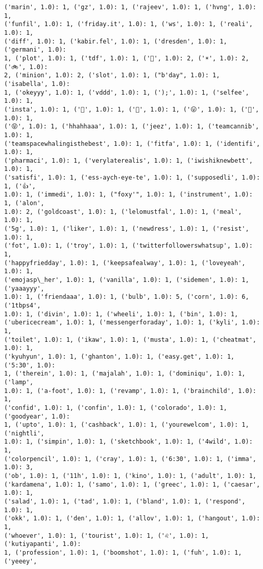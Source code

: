 \documentclass[11pt]{article}
\begin{document}
\begin{Verbatim}[commandchars=\\\{\}]
('marin', 1.0): 1, ('gz', 1.0): 1, ('rajeev', 1.0): 1, ('hvng', 1.0): 1,
('funfil', 1.0): 1, ('friday.it', 1.0): 1, ('ws', 1.0): 1, ('reali', 1.0): 1,
('diff', 1.0): 1, ('kabir.fel', 1.0): 1, ('dresden', 1.0): 1, ('germani', 1.0):
1, ('plot', 1.0): 1, ('tdf', 1.0): 1, ('🍷', 1.0): 2, ('☀', 1.0): 2, ('🚲', 1.0):
2, ('minion', 1.0): 2, ('slot', 1.0): 1, ("b'day", 1.0): 1, ('isabella', 1.0):
1, ('okeyyy', 1.0): 1, ('vddd', 1.0): 1, (');', 1.0): 1, ('selfee', 1.0): 1,
('insta', 1.0): 1, ('🙆', 1.0): 1, ('🙌', 1.0): 1, ('😛', 1.0): 1, ('🐒', 1.0): 1,
('😝', 1.0): 1, ('hhahhaaa', 1.0): 1, ('jeez', 1.0): 1, ('teamcannib', 1.0): 1,
('teamspacewhalingisthebest', 1.0): 1, ('fitfa', 1.0): 1, ('identifi', 1.0): 1,
('pharmaci', 1.0): 1, ('verylaterealis', 1.0): 1, ('iwishiknewbett', 1.0): 1,
('satisfi', 1.0): 1, ('ess-aych-eye-te', 1.0): 1, ('supposedli', 1.0): 1, ('👍',
1.0): 1, ('immedi', 1.0): 1, ("foxy'", 1.0): 1, ('instrument', 1.0): 1, ('alon',
1.0): 2, ('goldcoast', 1.0): 1, ('lelomustfal', 1.0): 1, ('meal', 1.0): 1,
('5g', 1.0): 1, ('liker', 1.0): 1, ('newdress', 1.0): 1, ('resist', 1.0): 1,
('fot', 1.0): 1, ('troy', 1.0): 1, ('twitterfollowerswhatsup', 1.0): 1,
('happyfriedday', 1.0): 1, ('keepsafealway', 1.0): 1, ('loveyeah', 1.0): 1,
('emojasp\_her', 1.0): 1, ('vanilla', 1.0): 1, ('sidemen', 1.0): 1, ('yaaayyy',
1.0): 1, ('friendaaa', 1.0): 1, ('bulb', 1.0): 5, ('corn', 1.0): 6, ('1tbps4',
1.0): 1, ('divin', 1.0): 1, ('wheeli', 1.0): 1, ('bin', 1.0): 1,
('ubericecream', 1.0): 1, ('messengerforaday', 1.0): 1, ('kyli', 1.0): 1,
('toilet', 1.0): 1, ('ikaw', 1.0): 1, ('musta', 1.0): 1, ('cheatmat', 1.0): 1,
('kyuhyun', 1.0): 1, ('ghanton', 1.0): 1, ('easy.get', 1.0): 1, ('5:30', 1.0):
1, ('therein', 1.0): 1, ('majalah', 1.0): 1, ('dominiqu', 1.0): 1, ('lamp',
1.0): 1, ('a-foot', 1.0): 1, ('revamp', 1.0): 1, ('brainchild', 1.0): 1,
('confid', 1.0): 1, ('confin', 1.0): 1, ('colorado', 1.0): 1, ('goodyear', 1.0):
1, ('upto', 1.0): 1, ('cashback', 1.0): 1, ('yourewelcom', 1.0): 1, ('nightli',
1.0): 1, ('simpin', 1.0): 1, ('sketchbook', 1.0): 1, ('4wild', 1.0): 1,
('colorpencil', 1.0): 1, ('cray', 1.0): 1, ('6:30', 1.0): 1, ('imma', 1.0): 3,
('ob', 1.0): 1, ('11h', 1.0): 1, ('kino', 1.0): 1, ('adult', 1.0): 1,
('kardamena', 1.0): 1, ('samo', 1.0): 1, ('greec', 1.0): 1, ('caesar', 1.0): 1,
('salad', 1.0): 1, ('tad', 1.0): 1, ('bland', 1.0): 1, ('respond', 1.0): 1,
('okk', 1.0): 1, ('den', 1.0): 1, ('allov', 1.0): 1, ('hangout', 1.0): 1,
('whoever', 1.0): 1, ('tourist', 1.0): 1, ('♌', 1.0): 1, ('kutiyapanti', 1.0):
1, ('profession', 1.0): 1, ('boomshot', 1.0): 1, ('fuh', 1.0): 1, ('yeeey',

\end{Verbatim}
\end{document}

